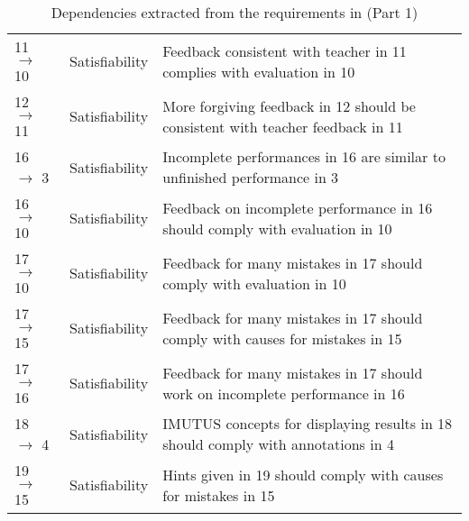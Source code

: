\documentclass[a4paper,11pt]{article}
\begin{document}
\begin{table}[h!]
\begin{tabular}{l | l | p{10cm}}
					11 $\rightarrow$ 10 & Satisfiability & Feedback consistent with teacher in 11 complies with evaluation in 10 \\
					12 $\rightarrow$ 11 & Satisfiability & More forgiving feedback in 12 should be consistent with teacher feedback in 11 \\
					16 $\rightarrow$ 3 & Satisfiability & Incomplete performances in 16 are similar to unfinished performance in 3 \\
					16 $\rightarrow$ 10 & Satisfiability & Feedback on incomplete performance in 16 should comply with evaluation in 10 \\
					17 $\rightarrow$ 10 & Satisfiability & Feedback for many mistakes in 17 should comply with evaluation in 10 \\
					17 $\rightarrow$ 15 & Satisfiability & Feedback for many mistakes in 17 should comply with causes for mistakes in 15 \\
					17 $\rightarrow$ 16 & Satisfiability & Feedback for many mistakes in 17 should work on incomplete performance in 16 \\
					18 $\rightarrow$ 4 & Satisfiability & IMUTUS concepts for displaying results in 18 should comply with annotations in 4 \\
					19 $\rightarrow$ 15 & Satisfiability & Hints given in 19 should comply with causes for mistakes in 15 \\
				\end{tabular}
				\caption{Dependencies extracted from the requirements in \cite{VEMUS} (Part 1)}
				\label{table:dep1}
			\end{table}
\end{document}
